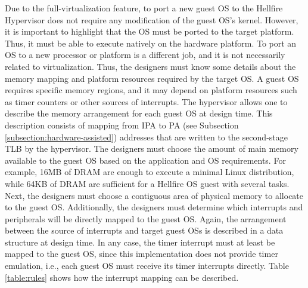 Due to the full-virtualization feature, to port a new guest OS to the Hellfire Hypervisor does not require any modification of the guest OS's kernel. However, it is important to highlight that the OS must be ported to the target platform. Thus, it must be able to execute natively on the hardware platform. To port an OS to a new processor or platform is a different job, and it is not necessarily related to virtualization. Thus, the designers must know some details about the memory mapping and platform resources required by the target OS. A guest OS requires specific memory regions, and it may depend on platform resources such as timer counters or other sources of interrupts. The hypervisor allows one to  describe the memory arrangement for each guest OS at design time. This description consists of mapping from IPA to PA (see Subsection \ref{subsection:hardware-assisted}) addresses that are written to the second-stage TLB by the hypervisor. The designers must choose the amount of main memory available to the guest OS based on the application and OS requirements. For example, 16MB of DRAM are enough to execute a minimal Linux distribution, while 64KB of DRAM are sufficient for a Hellfire OS guest with several tasks. Next, the designers must choose a contiguous area of physical memory to allocate to the guest OS. Additionally, the designers must determine which interrupts and peripherals will be directly mapped to the guest OS. Again, the arrangement between the source of interrupts and target guest OSs is described in a data structure at design time. In any case, the timer interrupt must at least be mapped to the guest OS, since this implementation does not provide timer emulation, i.e., each guest OS must receive its timer interrupts directly. Table \ref{table:rules} shows how the interrupt mapping can be described. 

